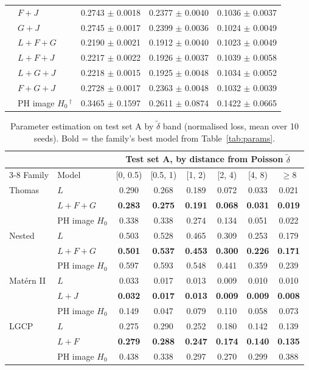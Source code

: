\documentclass[10pt,a4paper]{article}
\newcommand{\dtil}{\tilde\delta}
\newcommand{\B}[1]{\textbf{#1}}
\begin{document}
\begin{longtable}{@{}ll ccc@{}}
 & $F{+}J$ & 0.2743 $\pm$ 0.0018 & 0.2377 $\pm$ 0.0040 & 0.1036 $\pm$ 0.0037\\
 & $G{+}J$ & 0.2745 $\pm$ 0.0017 & 0.2399 $\pm$ 0.0036 & 0.1024 $\pm$ 0.0049\\
 & $L{+}F{+}G$ & 0.2190 $\pm$ 0.0021 & 0.1912 $\pm$ 0.0040 & 0.1023 $\pm$ 0.0049\\
 & $L{+}F{+}J$ & 0.2217 $\pm$ 0.0022 & 0.1926 $\pm$ 0.0037 & 0.1039 $\pm$ 0.0058\\
 & $L{+}G{+}J$ & 0.2218 $\pm$ 0.0015 & 0.1925 $\pm$ 0.0048 & 0.1034 $\pm$ 0.0052\\
 & $F{+}G{+}J$ & 0.2728 $\pm$ 0.0017 & 0.2363 $\pm$ 0.0048 & 0.1032 $\pm$ 0.0039\\
 & PH image $H_0$\,$^\dagger$ & 0.3465 $\pm$ 0.1597 & 0.2611 $\pm$ 0.0874 & 0.1422 $\pm$ 0.0665\\
\end{longtable}

\begin{table}[ht]
\centering\small
\begin{tabular}{@{}ll cccccc@{}}
\toprule
 & & \multicolumn{6}{c}{Test set A, by distance from Poisson $\dtil$}\\
\cmidrule(l){3-8}
Family & Model & [0, 0.5) & [0.5, 1) & [1, 2) & [2, 4) & [4, 8) & $\ge 8$\\
\midrule
Thomas & $L$ & 0.290 & 0.268 & 0.189 & 0.072 & 0.033 & 0.021\\
 & \B{$L{+}F{+}G$} & \B{0.283} & \B{0.275} & \B{0.191} & \B{0.068} & \B{0.031} & \B{0.019}\\
 & PH image $H_0$ & 0.338 & 0.338 & 0.274 & 0.134 & 0.051 & 0.022\\
\midrule
Nested & $L$ & 0.503 & 0.528 & 0.465 & 0.309 & 0.253 & 0.179\\
 & \B{$L{+}F{+}G$} & \B{0.501} & \B{0.537} & \B{0.453} & \B{0.300} & \B{0.226} & \B{0.171}\\
 & PH image $H_0$ & 0.597 & 0.593 & 0.548 & 0.441 & 0.359 & 0.239\\
\midrule
Mat\'ern II & $L$ & 0.033 & 0.017 & 0.013 & 0.009 & 0.010 & 0.010\\
 & \B{$L{+}J$} & \B{0.032} & \B{0.017} & \B{0.013} & \B{0.009} & \B{0.009} & \B{0.008}\\
 & PH image $H_0$ & 0.149 & 0.047 & 0.079 & 0.110 & 0.058 & 0.073\\
\midrule
LGCP & $L$ & 0.275 & 0.290 & 0.252 & 0.180 & 0.142 & 0.139\\
 & \B{$L{+}F$} & \B{0.279} & \B{0.288} & \B{0.247} & \B{0.174} & \B{0.140} & \B{0.135}\\
 & PH image $H_0$ & 0.438 & 0.338 & 0.297 & 0.270 & 0.299 & 0.388\\
\bottomrule
\end{tabular}
\caption{Parameter estimation on test set A by $\dtil$ band (normalised loss, mean over 10 seeds). Bold = the family's best model from Table~\ref{tab:params}.}
\label{tab:params-delta}
\end{table}
\end{document}

